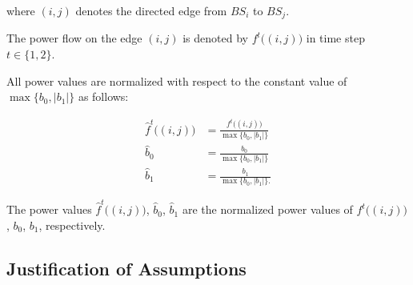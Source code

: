 \noindent
where $(i,j)$ denotes the directed edge from $BS_i$ to $BS_j$.


The power flow on the edge $(i,j)$ is denoted by $f^t\big((i,j)\big)$ in time step $t\in\{1,2\}$.

All power values are normalized with respect to the constant value of $\max\{b_0,|b_1|\}$ as follows:


\begin{equation}\label{normal}
\begin{aligned}
\hat{f}^t\big((i,j)\big)&=  \frac{f^t\big((i,j)\big)}{\max\{b_0,|b_1|\}}\\
 \hat{b}_0&=\frac{b_0}{\max\{b_0,|b_1|\}}\\
 \hat{b}_1&=\frac{b_1}{\max\{b_0,|b_1|\}.}
\end{aligned} 
\end{equation}

The power values $\hat{f}^t\big((i,j)\big)$, $\hat{b}_0$, $\hat{b}_1$ are the normalized power values of $f^t\big((i,j)\big)$, $b_0$, $b_1$, respectively.


\subsection{Justification of Assumptions}

